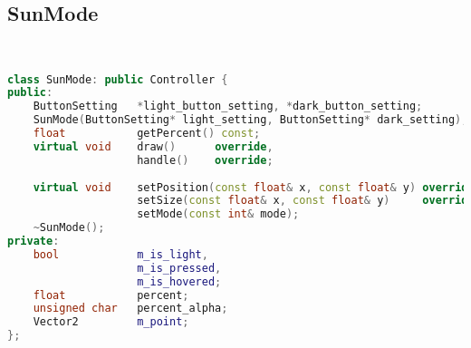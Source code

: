 \subsection{SunMode}
\begin{lstlisting}[language=C++]


class SunMode: public Controller {
public:
    ButtonSetting   *light_button_setting, *dark_button_setting;
    SunMode(ButtonSetting* light_setting, ButtonSetting* dark_setting);
    float           getPercent() const;
    virtual void    draw()      override,
                    handle()    override;
    
    virtual void    setPosition(const float& x, const float& y) override,
                    setSize(const float& x, const float& y)     override,
                    setMode(const int& mode);
    ~SunMode();
private:
    bool            m_is_light,
                    m_is_pressed,
                    m_is_hovered;
    float           percent;
    unsigned char   percent_alpha;
    Vector2         m_point;
};





\end{lstlisting}
